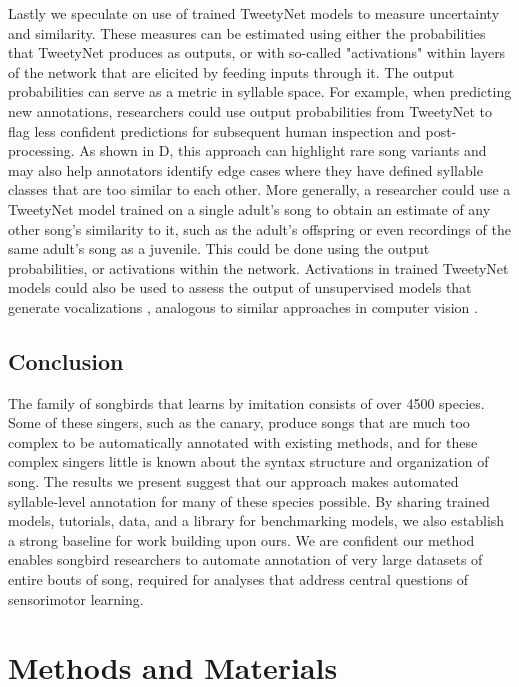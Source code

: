 \documentclass[9pt,lineno]{elife}
\begin{document}
Lastly we speculate on use of trained TweetyNet models to measure uncertainty and similarity. 
These measures can be estimated using either the probabilities that TweetyNet produces as outputs, 
or with so-called "activations" within layers of the network that are elicited by feeding inputs through it.
The output probabilities can serve as a metric in syllable space. 
For example, when predicting new annotations, researchers could use output probabilities from TweetyNet
to flag less confident predictions for subsequent human inspection and post-processing. 
As shown in D, this approach can highlight rare song variants 
and may also help annotators identify edge cases where they have defined syllable classes that are too similar to each other.
More generally, a researcher could use a TweetyNet model trained on a single adult's song to 
obtain an estimate of any other song's similarity to it, 
such as the adult's offspring or even recordings of the same adult's song as a juvenile. 
This could be done using the output probabilities, or activations within the network.
Activations in trained TweetyNet models could also be used to assess the output 
of unsupervised models that generate vocalizations \citep{sainburgAnimalVocalizationGenerative2019}, 
analogous to similar approaches in computer vision
\citep{salimans2016improved,heusel2017gans}.

\subsection{Conclusion}
The family of songbirds that learns by imitation consists of over 4500 species. 
Some of these singers, such as the canary, produce songs that are much too complex 
to be automatically annotated with existing methods, 
and for these complex singers little is known about the syntax structure and organization of song. 
The results we present suggest that our approach 
makes automated syllable-level annotation for many of these species possible. 
By sharing trained models, tutorials, data, 
and a library for benchmarking models, 
we also establish a strong baseline for work building upon ours.
We are confident our method enables songbird researchers to automate annotation 
of very large datasets of entire bouts of song, 
required for analyses that address central questions of sensorimotor learning. 

\section{Methods and Materials}
\label{Methods}
\end{document}
